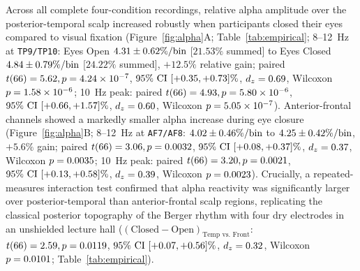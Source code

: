 \documentclass[11pt,letterpaper]{article}
\providecommand{\TempOpenSumPct}{21.53}
\providecommand{\TempClosedSumPct}{24.22}
\providecommand{\TempRelGainPct}{+12.5}
\providecommand{\FrontRelGainPct}{+5.6}
\begin{document}
Across all complete four-condition recordings, relative alpha amplitude over the posterior-temporal scalp increased robustly when participants closed their eyes compared to visual fixation (Figure~\ref{fig:alpha}A; Table~\ref{tab:empirical}; 8--12~Hz at \texttt{TP9/TP10}: Eyes Open $4.31 \pm 0.62\%/\text{bin}$ [$\TempOpenSumPct\%$ summed] to Eyes Closed $4.84 \pm 0.79\%/\text{bin}$ [$\TempClosedSumPct\%$ summed], $\TempRelGainPct\%$ relative gain; paired $t(66) = 5.62, p = 4.24\times 10^{-7}$, $95\%\text{ CI } [+0.35, +0.73]\%$, $d_z = 0.69$, Wilcoxon $p = 1.58\times 10^{-6}$; 10~Hz peak: paired $t(66) = 4.93, p = 5.80\times 10^{-6}$, $95\%\text{ CI } [+0.66, +1.57]\%$, $d_z = 0.60$, Wilcoxon $p = 5.05\times 10^{-7}$). Anterior-frontal channels showed a markedly smaller alpha increase during eye closure (Figure~\ref{fig:alpha}B; 8--12~Hz at \texttt{AF7/AF8}: $4.02 \pm 0.46\%/\text{bin}$ to $4.25 \pm 0.42\%/\text{bin}$, $\FrontRelGainPct\%$ gain; paired $t(66) = 3.06, p = 0.0032$, $95\%\text{ CI } [+0.08, +0.37]\%$, $d_z = 0.37$, Wilcoxon $p = 0.0035$; 10~Hz peak: paired $t(66) = 3.20, p = 0.0021$, $95\%\text{ CI } [+0.13, +0.58]\%$, $d_z = 0.39$, Wilcoxon $p = 0.0023$). Crucially, a repeated-measures interaction test confirmed that alpha reactivity was significantly larger over posterior-temporal than anterior-frontal scalp regions, replicating the classical posterior topography of the Berger rhythm \citep{berger1929elektrenkephalogramm} with four dry electrodes in an unshielded lecture hall ($(\text{Closed}-\text{Open})_{\text{Temp vs.\ Front}}$: $t(66) = 2.59, p = 0.0119$, $95\%\text{ CI } [+0.07, +0.56]\%$, $d_z = 0.32$, Wilcoxon $p = 0.0101$; Table~\ref{tab:empirical}).
\end{document}
